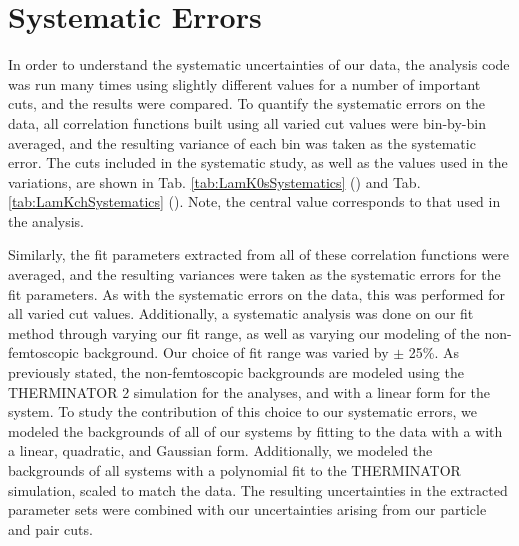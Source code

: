 \documentclass[../AnalysisNoteJBuxton.tex]{subfiles}
\begin{document}
\section{Systematic Errors}
\label{SystematicErrors}

In order to understand the systematic uncertainties of our data, the analysis code was run many times using slightly different values for a number of important cuts, and the results were compared.  
To quantify the systematic errors on the data, all correlation functions built using all varied cut values were bin-by-bin averaged, and the resulting variance of each bin was taken as the systematic error.  
The cuts included in the systematic study, as well as the values used in the variations, are shown in Tab. \ref{tab:LamK0sSystematics} (\LamKs) and Tab. \ref{tab:LamKchSystematics} (\LamKpm).  
Note, the central value corresponds to that used in the analysis.

Similarly, the fit parameters extracted from all of these correlation functions were averaged, and the resulting variances were taken as the systematic errors for the fit parameters.
As with the systematic errors on the data, this was performed for all varied cut values.
Additionally, a systematic analysis was done on our fit method through varying our \kstar fit range, as well as varying our modeling of the non-femtoscopic background.
Our choice of \kstar fit range was varied by $\pm$ 25\%. 
As previously stated, the non-femtoscopic backgrounds are modeled using the THERMINATOR 2 simulation for the \LamKpm analyses, and with a linear form for the \LamKs system.
To study the contribution of this choice to our systematic errors, we modeled the backgrounds of all of our systems by fitting to the data with a with a linear, quadratic, and Gaussian form.
Additionally, we modeled the backgrounds of all systems with a polynomial fit to the THERMINATOR simulation, scaled to match the data. 
The resulting uncertainties in the extracted parameter sets were combined with our uncertainties arising from our particle and pair cuts.





\end{document}
